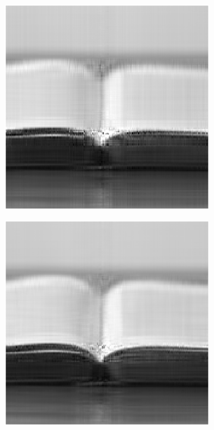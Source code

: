 \begin{figure}
    \begin{subfigure}{0.325\linewidth}
        \includegraphics[width=\linewidth]{Poglavja/Slike/preprosta grayscale 300/rez35LMaFit.png}
    \end{subfigure}
    \hfill
    \begin{subfigure}{0.325\linewidth}
        \includegraphics[width=\linewidth]{Poglavja/Slike/preprosta grayscale 300/rez45LMaFit.png}

\end{subfigure}
\end{figure}
